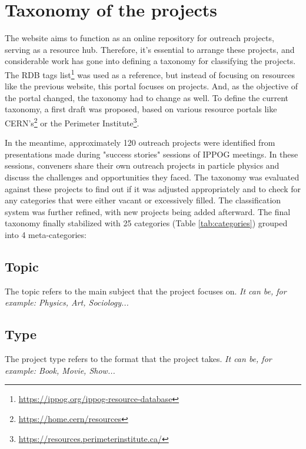 \newpage
\section{Taxonomy of the projects}\label{ssec:categorization}

The website aims to function as an online repository for outreach projects, serving as a resource hub. Therefore, it's essential to arrange these projects, and considerable work has gone into defining a taxonomy for classifying the projects. The RDB tags list\footnote{\href{https://ippog.org/ippog-resource-database}{https://ippog.org/ippog-resource-database}} was used as a reference, but instead of focusing on resources like the previous website, this portal focuses on projects. And, as the objective of the portal changed, the taxonomy had to change as well. To define the current taxonomy, a first draft was proposed, based on various resource portals like CERN's\footnote{\href{https://home.cern/resources}{https://home.cern/resources}} or the Perimeter Institute\footnote{\href{https://resources.perimeterinstitute.ca/}{https://resources.perimeterinstitute.ca/}}. 

In the meantime, approximately 120 outreach projects were identified from presentations made during "success stories" sessions of IPPOG meetings. In these sessions, conveners share their own outreach projects in particle physics and discuss the challenges and opportunities they faced. The taxonomy was evaluated against these projects to find out if it was adjusted appropriately and to check for any categories that were either vacant or excessively filled. The classification system was further refined, with new projects being added afterward. The final taxonomy finally stabilized with 25 categories (Table \ref{tab:categories}) grouped into 4 meta-categories: 

\subsection*{Topic}
The topic refers to the main subject that the project focuses on.\newline
\textit{It can be, for example: Physics, Art, Sociology...}

\subsection*{Type}
The project type refers to the format that the project takes.\newline
\textit{It can be, for example: Book, Movie, Show...}

